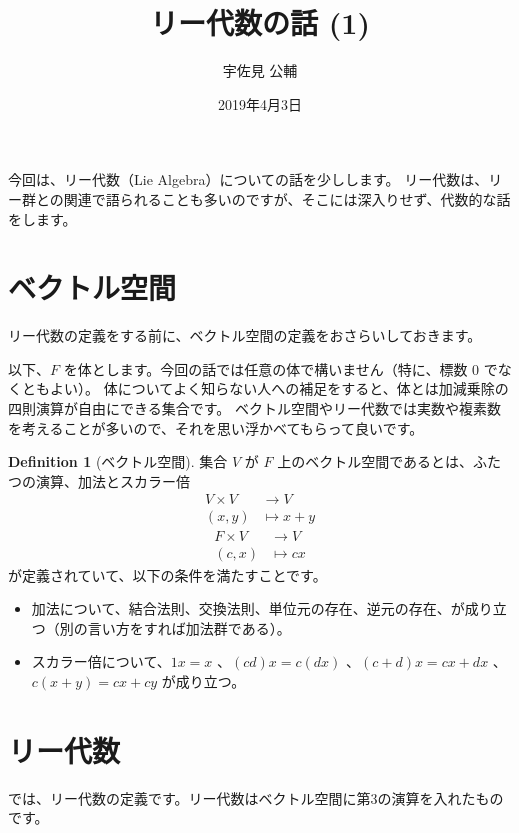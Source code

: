 \documentclass{ltjsarticle}
\title{リー代数の話 (1)}
\author{宇佐見 公輔}
\date{2019年4月3日}
\theoremstyle{definition}
\newtheorem{definition}{Definition}[section]
\begin{document}
\maketitle

今回は、リー代数（Lie Algebra）についての話を少しします。
リー代数は、リー群との関連で語られることも多いのですが、そこには深入りせず、代数的な話をします。

\section{ベクトル空間}

リー代数の定義をする前に、ベクトル空間の定義をおさらいしておきます。

以下、$F$ を体とします。今回の話では任意の体で構いません（特に、標数 $0$ でなくともよい）。
体についてよく知らない人への補足をすると、体とは加減乗除の四則演算が自由にできる集合です。
ベクトル空間やリー代数では実数や複素数を考えることが多いので、それを思い浮かべてもらって良いです。

\begin{definition}[ベクトル空間]
    集合 $V$ が $F$ 上のベクトル空間であるとは、ふたつの演算、加法とスカラー倍
    \begin{align*}
        V \times V & \to V         \\
        (x, y)     & \mapsto x + y
    \end{align*}
    \begin{align*}
        F \times V & \to V      \\
        (c, x)     & \mapsto cx
    \end{align*}
    が定義されていて、以下の条件を満たすことです。
    \begin{itemize}
        \item 加法について、結合法則、交換法則、単位元の存在、逆元の存在、が成り立つ（別の言い方をすれば加法群である）。
        \item スカラー倍について、$1x = x$ 、$(cd)x = c(dx)$ 、$(c + d)x = cx + dx$ 、$c(x + y) = cx + cy$
              が成り立つ。
    \end{itemize}
\end{definition}

\section{リー代数}

では、リー代数の定義です。リー代数はベクトル空間に第3の演算を入れたものです。
\end{document}
